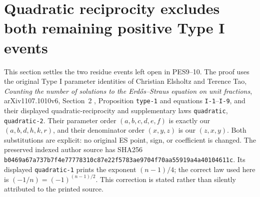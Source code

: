 \documentclass[11pt]{article}
\begin{document}
\section{Quadratic reciprocity excludes both remaining positive Type I events}
This section settles the two residue events left open in PES9--10.
The proof uses the original Type I parameter identities of Christian
Elsholtz and Terence Tao, \emph{Counting the number of solutions to the
Erd\H{o}s--Straus equation on unit fractions}, arXiv1107.1010v6,
Section~2 \cite[Section~2]{ElsholtzTao2015},
Proposition \texttt{type-1} and equations \texttt{I-1}--\texttt{I-9},
and their displayed quadratic-reciprocity and supplementary laws
\texttt{quadratic}, \texttt{quadratic-2}. Their parameter order
$(a,b,c,d,e,f)$ is exactly our $(a,b,d,h,k,r)$, and their denominator
order $(x,y,z)$ is our $(z,x,y)$. Both substitutions are explicit:
no original ES point, sign, or coefficient is changed. The preserved
indexed author source has SHA256
\texttt{b0469a67a737b7f4e77778310c87e22f5783ae9704f70aa55919a4a40104611c}.
Its displayed \texttt{quadratic-1} prints the exponent $(n-1)/4$;
the correct law used here is $(-1/n)=(-1)^{(n-1)/2}$. This correction
is stated rather than silently attributed to the printed source.
\end{document}
